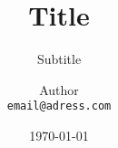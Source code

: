\documentclass[11pt,a4paper]{scrartcl}
\title{Title}
\subtitle{Subtitle}
\author{Author \\ \texttt{email@adress.com}}
\date{\today}
\begin{document}
  \maketitle
  \setcounter{tocdepth}{2}
  \tableofcontents

\pagebreak
  

\pagebreak
  \printbibliography

\pagebreak
  \begin{appendices}
    
  \end{appendices}
\end{document}
